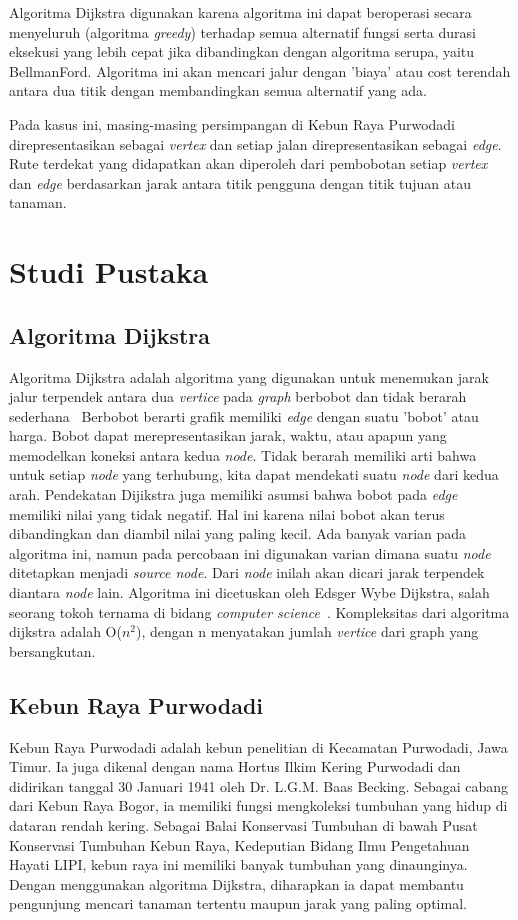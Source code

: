 \documentclass[conference]{IEEEtran}
\begin{document}
Algoritma Dijkstra digunakan karena algoritma ini dapat
beroperasi secara menyeluruh (algoritma \emph{greedy}) terhadap
semua alternatif fungsi serta durasi eksekusi yang lebih cepat
jika dibandingkan dengan algoritma serupa, yaitu BellmanFord. Algoritma ini akan mencari jalur dengan ’biaya’ atau
cost terendah antara dua titik dengan membandingkan semua
alternatif yang ada.

Pada kasus ini, masing-masing persimpangan di Kebun
Raya Purwodadi direpresentasikan sebagai \emph{vertex} dan setiap
jalan direpresentasikan sebagai \emph{edge}. Rute terdekat yang didapatkan akan diperoleh dari pembobotan setiap \emph{vertex} dan \emph{edge}
berdasarkan jarak antara titik pengguna dengan titik tujuan
atau tanaman.

\section{Studi Pustaka}

\subsection{Algoritma Dijkstra}
Algoritma Dijkstra adalah algoritma yang digunakan untuk
menemukan jarak jalur terpendek antara dua \emph{vertice} pada
\emph{graph} berbobot dan tidak berarah sederhana~\cite{rosen_discrete_2012}
Berbobot berarti grafik memiliki \emph{edge} dengan suatu ’bobot’ atau harga.
Bobot dapat merepresentasikan jarak, waktu, atau apapun
yang memodelkan koneksi antara kedua \emph{node}. Tidak berarah
memiliki arti bahwa untuk setiap \emph{node} yang terhubung, kita
dapat mendekati suatu \emph{node} dari kedua arah. Pendekatan Dijikstra juga memiliki asumsi bahwa bobot pada \emph{edge} memiliki
nilai yang tidak negatif. Hal ini karena nilai bobot akan
terus dibandingkan dan diambil nilai yang paling kecil. Ada
banyak varian pada algoritma ini, namun pada percobaan
ini digunakan varian dimana suatu \emph{node} ditetapkan menjadi
\emph{source node}. Dari \emph{node} inilah akan dicari jarak terpendek
diantara \emph{node} lain. Algoritma ini dicetuskan oleh Edsger
Wybe Dijkstra, salah seorang tokoh ternama di bidang \emph{computer science}~\cite{dijkstra_note_1959}.
Kompleksitas dari algoritma dijkstra adalah
O(\(n^2\)), dengan n menyatakan jumlah \emph{vertice} dari graph yang
bersangkutan.

\subsection{Kebun Raya Purwodadi}
Kebun Raya Purwodadi adalah kebun penelitian di Kecamatan Purwodadi, Jawa Timur. Ia juga dikenal dengan nama
Hortus Ilkim Kering Purwodadi dan didirikan tanggal 30 Januari 1941 oleh Dr. L.G.M. Baas Becking. Sebagai cabang dari
Kebun Raya Bogor, ia memiliki fungsi mengkoleksi tumbuhan
yang hidup di dataran rendah kering. Sebagai Balai Konservasi
Tumbuhan di bawah Pusat Konservasi Tumbuhan Kebun Raya,
Kedeputian Bidang Ilmu Pengetahuan Hayati LIPI, kebun raya
ini memiliki banyak tumbuhan yang dinaunginya. Dengan
menggunakan algoritma Dijkstra, diharapkan ia dapat membantu pengunjung mencari tanaman tertentu maupun jarak
yang paling optimal.
\end{document}
